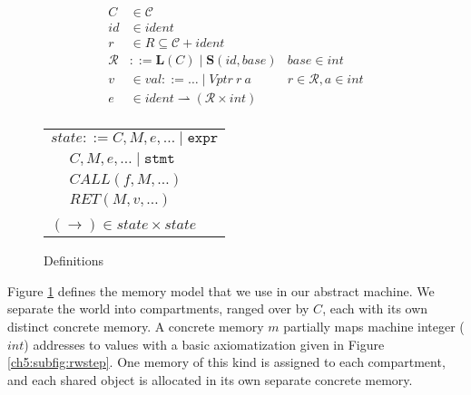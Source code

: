 \begin{figure}
\begin{minipage}[t]{0.49\textwidth}
\[\begin{aligned}
    C & \in \mathcal{C} \\
    id & \in \mathit{ident} \\
    r & \in R \subseteq \mathcal{C} + \mathit{ident} \\
    \mathcal{R} & ::= \mathbf{L}(C) \mid \mathbf{S}(id, \mathit{base}) &
    \mathit{base} \in \mathit{int} \\
    v & \in \mathit{val} ::= \ldots \mid \mathit{Vptr} ~ r ~ a &
    r \in \mathcal{R}, a \in \mathit{int} \\
    e & \in \mathit{ident} \rightharpoonup (\mathcal{R} \times \mathit{int}) \\
    \end{aligned}\]
    \begin{tabular}{l | l}
      \multicolumn{2}{r}{\(\mathit{state} ::= C, M, e, \ldots \mid \mathtt{expr}\)} \\
      \hspace{4em} & \(C, M, e, \ldots \mid \mathtt{stmt}\) \\
      \hspace{4em} & \(\mathit{CALL}(f, M, \ldots)\)  \\
      \hspace{4em} & \(\mathit{RET}(M, v, \ldots)\) \\
      \multicolumn{2}{l}{} \\
      \multicolumn{2}{l}{\hspace{1.5em}\((\longrightarrow) \in
        \mathit{state} \times \mathit{state}\)} \\
    \end{tabular}
  \end{minipage}

  \caption{Definitions}
  \label{ch5:fig:memmod}
\end{figure}

Figure \ref{ch5:fig:memmod} defines the memory model that we use in our abstract machine.
We separate the world into compartments, ranged over by \(C\), each with its own distinct
concrete memory. A concrete memory \(m\) partially maps machine
integer (\(\mathit{int}\)) addresses to values with a basic axiomatization given in
Figure \ref{ch5:subfig:rwstep}. One memory of this kind is assigned to each compartment, and
each shared object is allocated in its own separate concrete memory.

